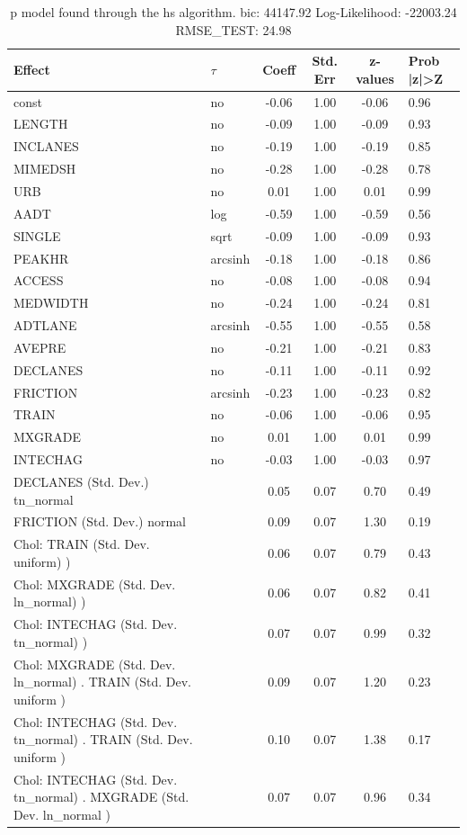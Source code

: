 \begin{table}
	\caption{p model found through the hs algorithm. bic: 44147.92 Log-Likelihood: -22003.24 RMSE_TEST: 24.98}
	\begin{center}
		\begin{tabular}{|l|l|c|c|c|l|}
			\hline
			Effect & $\tau$ & Coeff & Std. Err & z-values & Prob |z|>Z \\
			\hline
			const & no & -0.06 & 1.00 & -0.06 & 0.96 \\
			\hline
			LENGTH & no & -0.09 & 1.00 & -0.09 & 0.93 \\
			\hline
			INCLANES & no & -0.19 & 1.00 & -0.19 & 0.85 \\
			\hline
			MIMEDSH & no & -0.28 & 1.00 & -0.28 & 0.78 \\
			\hline
			URB & no & 0.01 & 1.00 & 0.01 & 0.99 \\
			\hline
			AADT & log & -0.59 & 1.00 & -0.59 & 0.56 \\
			\hline
			SINGLE & sqrt & -0.09 & 1.00 & -0.09 & 0.93 \\
			\hline
			PEAKHR & arcsinh & -0.18 & 1.00 & -0.18 & 0.86 \\
			\hline
			ACCESS & no & -0.08 & 1.00 & -0.08 & 0.94 \\
			\hline
			MEDWIDTH & no & -0.24 & 1.00 & -0.24 & 0.81 \\
			\hline
			ADTLANE & arcsinh & -0.55 & 1.00 & -0.55 & 0.58 \\
			\hline
			AVEPRE & no & -0.21 & 1.00 & -0.21 & 0.83 \\
			\hline
			DECLANES & no & -0.11 & 1.00 & -0.11 & 0.92 \\
			\hline
			FRICTION & arcsinh & -0.23 & 1.00 & -0.23 & 0.82 \\
			\hline
			TRAIN & no & -0.06 & 1.00 & -0.06 & 0.95 \\
			\hline
			MXGRADE & no & 0.01 & 1.00 & 0.01 & 0.99 \\
			\hline
			INTECHAG & no & -0.03 & 1.00 & -0.03 & 0.97 \\
			\hline
			DECLANES (Std. Dev.) tn_normal &  & 0.05 & 0.07 & 0.70 & 0.49 \\
			\hline
			FRICTION (Std. Dev.) normal &  & 0.09 & 0.07 & 1.30 & 0.19 \\
			\hline
			 Chol: TRAIN (Std. Dev. uniform) ) &  & 0.06 & 0.07 & 0.79 & 0.43 \\
			\hline
			 Chol: MXGRADE (Std. Dev. ln_normal) ) &  & 0.06 & 0.07 & 0.82 & 0.41 \\
			\hline
			 Chol: INTECHAG (Std. Dev. tn_normal) ) &  & 0.07 & 0.07 & 0.99 & 0.32 \\
			\hline
			 Chol: MXGRADE (Std. Dev. ln_normal) . TRAIN (Std. Dev.   uniform ) &  & 0.09 & 0.07 & 1.20 & 0.23 \\
			\hline
			 Chol: INTECHAG (Std. Dev. tn_normal) . TRAIN (Std. Dev.   uniform ) &  & 0.10 & 0.07 & 1.38 & 0.17 \\
			\hline
			 Chol: INTECHAG (Std. Dev. tn_normal) . MXGRADE (Std. Dev.   ln_normal ) &  & 0.07 & 0.07 & 0.96 & 0.34 \\
			\hline
		\end{tabular}
	\end{center}
\end{table}